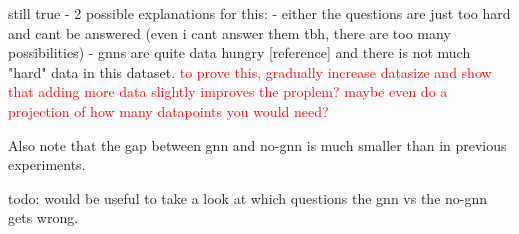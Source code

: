 still true - 2 possible explanations for this:
- either the questions are just too hard and cant be answered (even i cant answer them tbh, there are too many possibilities)
- gnns are quite data hungry [reference] and there is not much "hard" data in this dataset. \textcolor{red}{to prove this, gradually increase datasize and show that adding more data slightly improves the proplem? maybe even do a projection of how many datapoints you would need?}

Also note that the gap between gnn and no-gnn is much smaller than in previous experiments.

todo: would be useful to take a look at which questions the gnn vs the no-gnn gets wrong.